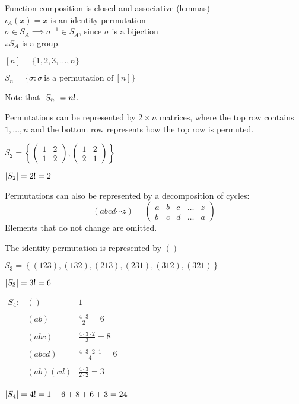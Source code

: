 \documentclass[letterpaper,12pt,fleqn]{article}
\renewcommand{\o}{\sigma}
\renewcommand{\i}{\iota}
\begin{document}
\begin{theproof}
  Function composition is closed and associative (lemmas) \\
  $\i_A(x)=x$ is an identity permutation \\
  $\o\in S_A\implies\o^{-1}\in S_A$, since $\o$ is a bijection \\
  $\therefore S_A$ is a group.
\end{theproof}

\begin{definition}
  $[n]=\{1,2,3,\ldots,n\}$

  $S_n=\{\o:\o\ \mbox{is a permutation of}\ [n]\}$
\end{definition}

Note that $\lvert S_n\rvert=n!$.

Permutations can be represented by $2\times n$ matrices, where the top row
contains $1,\ldots,n$ and the bottom row represents how the top row is
permuted.

\begin{example}
  $S_2=\left\{\begin{pmatrix}1 & 2 \\ 1 & 2\end{pmatrix},
  \begin{pmatrix}1 & 2 \\ 2 & 1\end{pmatrix}\right\}$
    
  $\lvert S_2\rvert=2!=2$
\end{example}

Permutations can also be represented by a decomposition of cycles:
\[(abcd\cdots z)=\begin{pmatrix}a & b & c & \ldots & z \\
b & c & d & \ldots & a\end{pmatrix}\]
Elements that do not change are omitted.

The identity permutation is represented by $()$

\begin{example}
  $S_3=\left\{(123),(132),(213),(231),(312),(321)\right\}$

  $\lvert S_3\rvert=3!=6$
\end{example}
\newpage
\begin{example}
  $\begin{array}{lll}
    S_4: & () & 1 \\
    \\
    & (ab) & \frac{4\cdot3}{2}=6 \\
    \\
    & (abc) & \frac{4\cdot3\cdot2}{3}=8 \\
    \\
    & (abcd) & \frac{4\cdot3\cdot2\cdot1}{4}=6 \\
    \\
    & (ab)(cd) & \frac{4\cdot3}{2\cdot2}=3 \\
  \end{array}$

  $\lvert S_4\rvert=4!=1+6+8+6+3=24$
\end{example}
\end{document}
